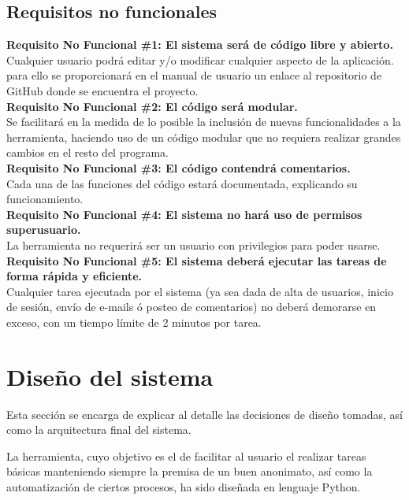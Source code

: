 \subsection{Requisitos no funcionales}
\begin{adjustwidth}{0.5cm}{}
	\textbf{Requisito No Funcional \#1: El sistema será de código libre y abierto.}\\
	Cualquier usuario podrá editar y/o modificar cualquier aspecto de la aplicación. para ello se proporcionará en el manual de usuario un enlace al repositorio de GitHub donde se encuentra el proyecto. \\
	\linebreak		
	\textbf{Requisito No Funcional \#2: El código será modular.}\\
	Se facilitará en la medida de lo posible la inclusión de nuevas funcionalidades a la herramienta, haciendo uso de un código modular que no requiera realizar grandes cambios en el resto del programa. \\
	\linebreak		
	\textbf{Requisito No Funcional \#3: El código contendrá comentarios.}\\
	Cada una de las funciones del código estará documentada, explicando su funcionamiento. \\	
	\linebreak			
	\textbf{Requisito No Funcional \#4: El sistema no hará uso de permisos superusuario.}\\
	La herramienta no requerirá ser un usuario con privilegios para poder usarse. \\	
	\linebreak
	\textbf{Requisito No Funcional \#5: El sistema deberá ejecutar las tareas de forma rápida y eficiente.}\\
	Cualquier tarea ejecutada por el sistema (ya sea dada de alta de usuarios, inicio de sesión, envío de e-mails ó posteo de comentarios) no deberá demorarse en exceso, con un tiempo límite de 2 minutos por tarea. \\		
\end{adjustwidth}
\newpage
\section{Diseño del sistema}

Esta sección se encarga de explicar al detalle las decisiones de diseño tomadas, así como la arquitectura final del sistema. 

La herramienta, cuyo objetivo es el de facilitar al usuario el realizar tareas básicas manteniendo siempre la premisa de un buen anonimato, así como la automatización de ciertos procesos, ha sido diseñada en lenguaje Python. 

